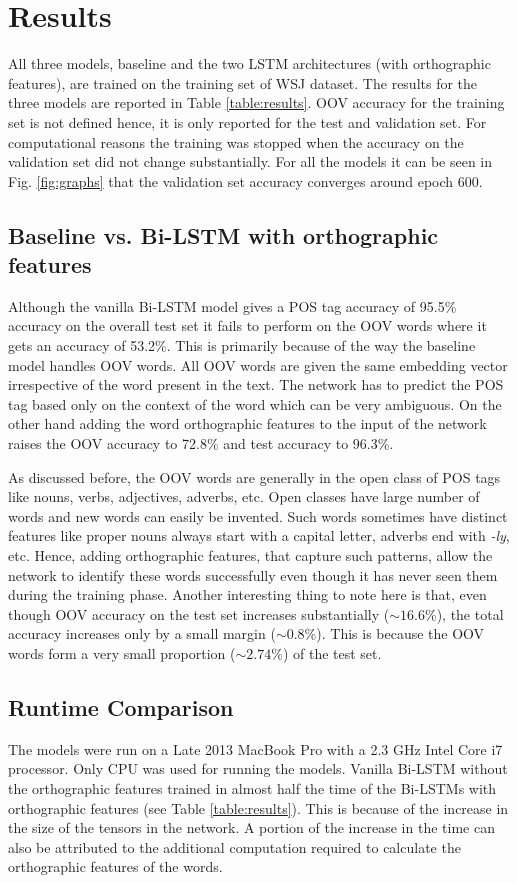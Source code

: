 \documentclass[11pt,letterpaper]{article}
\begin{document}
\section{Results}
All three models, baseline and the two LSTM architectures (with orthographic features), are trained on the training set of WSJ dataset. The results for the three models are reported in Table \ref{table:results}. OOV accuracy for the training set is not defined hence, it is only reported for the test and validation set. For computational reasons the training was stopped when the accuracy on the validation set did not change substantially. For all the models it can be seen in Fig. \ref{fig:graphs} that the validation set accuracy converges around epoch 600.

\subsection{Baseline vs. Bi-LSTM with orthographic features}
Although the vanilla Bi-LSTM model gives a POS tag accuracy of 95.5\% accuracy on the overall test set it fails to perform on the OOV words where it gets an accuracy of 53.2\%. This is primarily because of the way the baseline model handles OOV words. All OOV words are given the same embedding vector irrespective of the word present in the text. The network has to predict the POS tag based only on the context of the word which can be very ambiguous. On the other hand adding the word orthographic features to the input of the network raises the OOV accuracy to 72.8\% and test accuracy to 96.3\%.

As discussed before, the OOV words are generally in the open class of POS tags like nouns, verbs, adjectives, adverbs, etc. Open classes have large number of words and new words can easily be invented. Such words sometimes have distinct features like proper nouns always start with a capital letter, adverbs end with \emph{-ly}, etc. Hence, adding orthographic features, that capture such patterns, allow the network to identify these words successfully even though it has never seen them during the training phase. Another interesting thing to note here is that, even though OOV accuracy on the test set increases substantially ($\sim16.6\%$), the total accuracy increases only by a small margin ($\sim0.8\%$). This is because the OOV words form a very small proportion ($\sim2.74\%$) of the test set.

\subsection{Runtime Comparison}
The models were run on a Late 2013 MacBook Pro with a 2.3 GHz Intel Core i7 processor. Only CPU was used for running the models. Vanilla Bi-LSTM without the orthographic features trained in almost half the time of the Bi-LSTMs with orthographic features (see Table \ref{table:results}). This is because of the increase in the size of the tensors in the network. A portion of the increase in the time can also be attributed to the additional computation required to calculate the orthographic features of the words.
\end{document}

